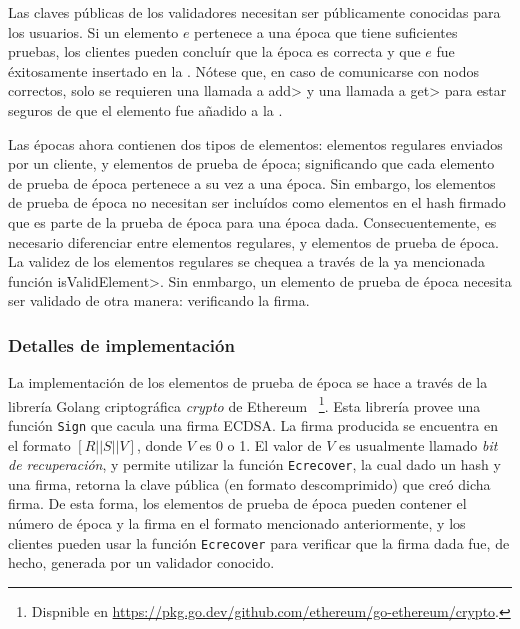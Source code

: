 %
Las claves públicas de los validadores necesitan ser públicamente conocidas para los usuarios.
%
Si un elemento $e$ pertenece a una época que tiene suficientes pruebas, los clientes pueden
concluír que la época es correcta y que $e$ fue éxitosamente insertado en la \setchain.
%
Nótese que, en caso de comunicarse con nodos correctos, solo se requieren una llamada a \<add> y
una llamada a \<get> para estar seguros de que el elemento fue añadido a la \setchain.
%

Las épocas ahora contienen dos tipos de elementos: elementos regulares enviados por
un cliente, y elementos de prueba de época; significando que cada elemento de prueba de época
pertenece a su vez a una época. Sin embargo, los elementos de prueba de época no necesitan ser
incluídos como elementos en el hash firmado que es parte de la prueba de época para una época
dada.
%
Consecuentemente, es necesario diferenciar entre elementos regulares, y elementos de prueba de época.
%
La validez de los elementos regulares se chequea a través de la ya mencionada función
\<isValidElement>.
%
Sin enmbargo, un elemento de prueba de época necesita ser validado de otra manera: verificando la firma.
%

\subsubsection{Detalles de implementación}

La implementación de los elementos de prueba de época se hace a través de la librería
Golang criptográfica \textit{crypto} de Ethereum
~\footnote{Dispnible en \url{https://pkg.go.dev/github.com/ethereum/go-ethereum/crypto}.}.
%
Esta librería provee una función \texttt{Sign} que cacula una firma ECDSA.
%
La firma producida se encuentra en el formato $[R || S || V]$, donde $V$ es 0 o 1.
%
El valor de $V$ es usualmente llamado \textit{bit de recuperación}, y permite utilizar
la función \texttt{Ecrecover}, la cual dado un hash y una firma, retorna la clave pública
(en formato descomprimido) que creó dicha firma.
%
De esta forma, los elementos de prueba de época pueden contener el número de época y la firma
en el formato mencionado anteriormente, y los clientes pueden usar la función \texttt{Ecrecover} para
verificar que la firma dada fue, de hecho, generada por un validador conocido.
%


